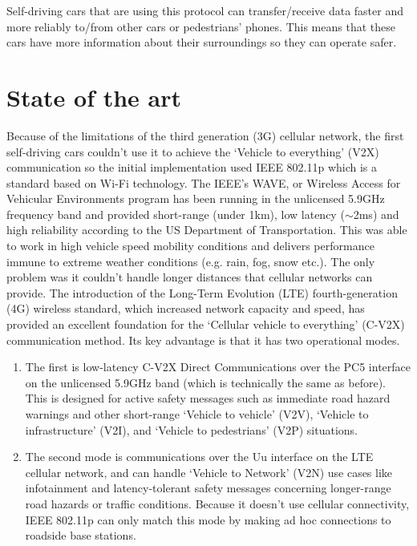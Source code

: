 \documentclass[conference]{IEEEtran}
\begin{document}
Self-driving cars that are using this protocol can transfer/receive data faster and more reliably to/from other cars or pedestrians' phones. This means that these cars have more information about their surroundings so they can operate safer.

\section{State of the art}
Because of the limitations of the third generation (3G) cellular network, the first self-driving cars couldn’t use it to achieve the ‘Vehicle to everything’ (V2X) communication so the initial implementation used IEEE 802.11p  which is a standard based on Wi-Fi technology. The IEEE's WAVE, or Wireless Access for Vehicular Environments program has been running in the unlicensed 5.9GHz frequency band and provided short-range (under 1km), low latency ($ \sim $2ms) and high reliability according to the US Department of Transportation. This was able to work in high vehicle speed mobility conditions and delivers performance immune to extreme weather conditions (e.g. rain, fog, snow etc.). The only problem was it couldn’t handle longer distances that cellular networks can provide. The introduction of the Long-Term Evolution (LTE) fourth-generation (4G) wireless standard, which increased network capacity and speed, has provided an excellent foundation for the ‘Cellular vehicle to everything’ (C-V2X) communication method. Its key advantage is that it has two operational modes.

\begin{enumerate}
    \item The first is low-latency C-V2X Direct Communications over the PC5 interface on the unlicensed 5.9GHz band (which is technically the same as before). This is designed for active safety messages such as immediate road hazard warnings and other short-range ‘Vehicle to vehicle’ (V2V), ‘Vehicle to infrastructure’ (V2I), and ‘Vehicle to pedestrians’ (V2P) situations.
    \item The second mode is communications over the Uu interface on the LTE cellular network, and can handle ‘Vehicle to Network’ (V2N) use cases like infotainment and latency-tolerant safety messages concerning longer-range road hazards or traffic conditions. Because it doesn't use cellular connectivity, IEEE 802.11p can only match this mode by making ad hoc connections to roadside base stations. \cite{b2}
\end{enumerate}
\end{document}
